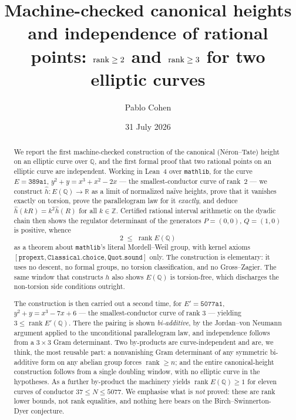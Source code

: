 \documentclass[11pt,reqno]{amsart}
\title[Machine-checked canonical heights and independence of rational
points]{Machine-checked canonical heights and independence of rational
points: $\rank \ge 2$ and $\rank \ge 3$ for two elliptic curves}
\author{Pablo Cohen}
\date{31 July 2026}
\theoremstyle{plain}
\theoremstyle{definition}
\theoremstyle{remark}
\newcommand{\hh}{\widehat{h}}
\DeclareMathOperator{\rank}{rank}
\begin{document}
\begin{abstract}
We report the first machine-checked construction of the canonical (N\'eron--Tate)
height on an elliptic curve over $\mathbb{Q}$, and the first formal proof that
two rational points on an elliptic curve are independent. Working in Lean~4
over \texttt{mathlib}, for the curve $E = \mathtt{389a1}$,
$y^2 + y = x^3 + x^2 - 2x$ --- the smallest-conductor curve of rank~$2$ ---
we construct $\hh \colon E(\mathbb{Q}) \to \mathbb{R}$ as a limit of
normalized na\"ive heights, prove that it vanishes exactly on torsion, prove
the parallelogram law for it \emph{exactly}, and deduce
$\hh(kR) = k^2\hh(R)$ for all $k \in \mathbb{Z}$. Certified rational interval
arithmetic on the dyadic chain then shows the regulator determinant of the
generators $P = (0,0)$, $Q = (1,0)$ is positive, whence
\[
  2 \;\le\; \rank E(\mathbb{Q})
\]
as a theorem about \texttt{mathlib}'s literal Mordell--Weil group, with
kernel axioms $[\mathtt{propext}, \mathtt{Classical.choice},
\mathtt{Quot.sound}]$ only. The construction is elementary: it uses no
descent, no formal groups, no torsion classification, and no
Gross--Zagier. The same window that constructs $\hh$ also shows
$E(\mathbb{Q})$ is torsion-free, which discharges the non-torsion side
conditions outright.

The construction is then carried out a second time, for
$E' = \mathtt{5077a1}$, $y^2+y = x^3-7x+6$ --- the smallest-conductor curve of
rank $3$ --- yielding $3 \le \rank E'(\mathbb{Q})$. There the pairing is shown
\emph{bi-additive}, by the Jordan--von Neumann argument applied to the
unconditional parallelogram law, and independence follows from a $3\times3$
Gram determinant. Two by-products are curve-independent and are, we think, the
most reusable part: a nonvanishing Gram determinant of any symmetric
bi-additive form on any abelian group forces $\rank \ge n$; and the entire
canonical-height construction follows from a single doubling window, with no
elliptic curve in the hypotheses. As a further by-product the machinery yields
$\rank E(\mathbb{Q}) \ge 1$ for eleven curves of conductor
$37 \le N \le 5077$. We emphasise what is \emph{not} proved: these are rank
lower bounds, not rank equalities, and nothing here bears on the
Birch--Swinnerton-Dyer conjecture.
\end{abstract}

\maketitle
\end{document}
